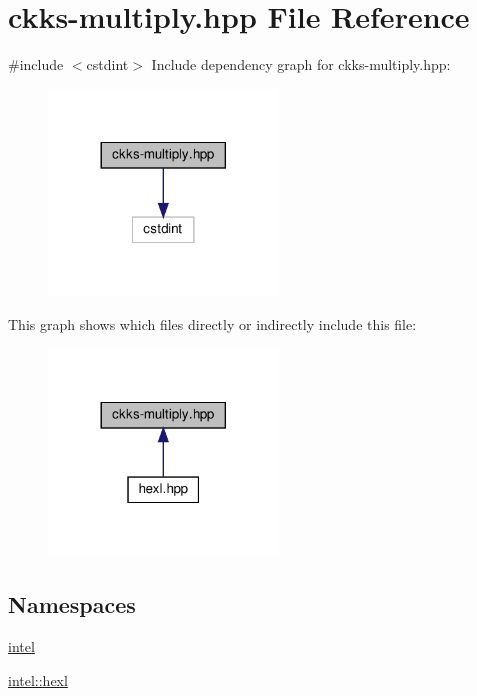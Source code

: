 \hypertarget{ckks-multiply_8hpp}{}\section{ckks-\/multiply.hpp File Reference}
\label{ckks-multiply_8hpp}
{\ttfamily \#include $<$cstdint$>$}\newline
Include dependency graph for ckks-\/multiply.hpp\+:
\nopagebreak
\begin{figure}[H]
\begin{center}
\leavevmode
\includegraphics[width=173pt]{ckks-multiply_8hpp__incl}
\end{center}
\end{figure}
This graph shows which files directly or indirectly include this file\+:
\nopagebreak
\begin{figure}[H]
\begin{center}
\leavevmode
\includegraphics[width=173pt]{ckks-multiply_8hpp__dep__incl}
\end{center}
\end{figure}
\subsection*{Namespaces}
\begin{DoxyCompactItemize}
\item 
 \hyperlink{namespaceintel}{intel}
\item 
 \hyperlink{namespaceintel_1_1hexl}{intel\+::hexl}
\end{DoxyCompactItemize}
